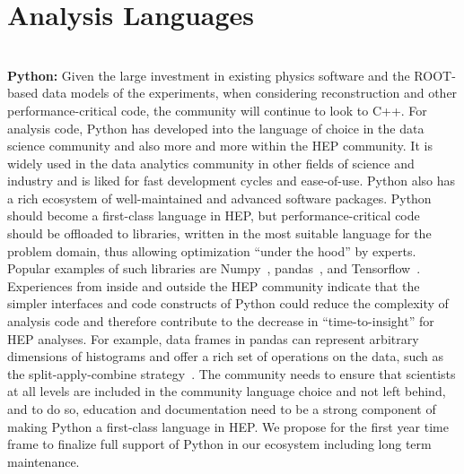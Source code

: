 \documentclass[12pt,a4paper]{article}
\begin{document}
\section{Analysis Languages}~\\
{\bf Python:} Given the large investment in existing physics software and the ROOT-based data models of the experiments, when considering reconstruction and other performance-critical code, the community will continue to look to C++. For analysis code, Python has developed into the language of choice in the data science community and also more and more within the HEP community. It is widely used in the data analytics community in other fields of science and industry and is liked for fast development cycles and ease-of-use. Python also has a rich ecosystem of well-maintained and advanced software packages. Python should become a first-class language in HEP, but performance-critical code should be offloaded to libraries, written in the most suitable language for the problem domain, thus allowing optimization ``under the hood'' by experts. Popular examples of such libraries are Numpy~\cite{5725236-numpy}, pandas~\cite{mckinney-proc-scipy-2010}, and Tensorflow~\cite{abadi2016tensorflow}.  Experiences from inside and outside the HEP community indicate that the simpler interfaces and code constructs of Python could reduce the complexity of analysis code and therefore contribute to the decrease in ``time-to-insight'' for HEP analyses. For example, data frames in pandas can represent arbitrary dimensions of histograms and offer a rich set of operations on the data, such as the split-apply-combine strategy~\cite{JSSv040i01}. The community needs to ensure that scientists at all levels are included in the community language choice and not left behind, and to do so, education and documentation need to be a strong component of making Python a first-class language in HEP. We propose for the first year time frame to finalize full support of Python in our ecosystem including long term maintenance.\\ \\
\end{document}
